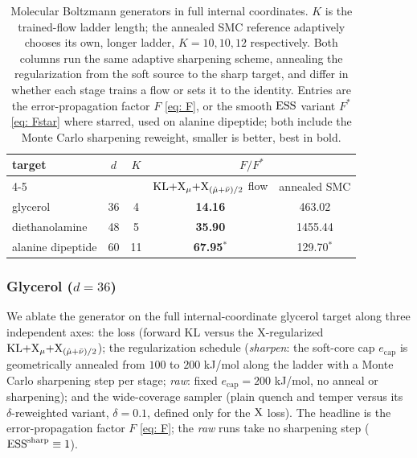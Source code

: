 \documentclass{article}
\begin{document}
\begin{table}[h]
    \centering
    \small
    \begin{tabular}{@{}lcccc@{}}
        \toprule
        \multirow{2}{*}{target} & \multirow{2}{*}{$d$} & \multirow{2}{*}{$K$} & \multicolumn{2}{c}{$F/F^{*}$} \\
        \cmidrule(l){4-5}
        & & & $\mathrm{KL}{+}\mathrm{X}_\mu{+}\mathrm{X}_{(\hat\mu+\bar\nu)/2}$ flow & annealed SMC \\
        \midrule
        glycerol            & 36 & 4  & \textbf{14.16} & 463.02 \\
        diethanolamine      & 48 & 5  & \textbf{35.90} & 1455.44 \\
        alanine dipeptide   & 60 & 11 & \textbf{67.95}$^{*}$ & 129.70$^{*}$ \\
        \bottomrule
    \end{tabular}
    \caption{Molecular Boltzmann generators in full internal coordinates. $K$ is the trained-flow ladder
    length; the annealed SMC reference adaptively chooses its own, longer ladder, $K = 10, 10, 12$
    respectively. Both columns run the same adaptive sharpening scheme, annealing the regularization from the
    soft source to the sharp target, and differ in whether each stage trains a flow or sets it to the
    identity. Entries are the error-propagation factor $F$ \eqref{eq: F}, or the smooth $\mathrm{ESS}$ variant
    $F^{*}$ \eqref{eq: Fstar} where starred, used on alanine dipeptide; both include the Monte Carlo
    sharpening reweight, smaller is better, best in bold.}
    \label{tab: overview}
\end{table}

\subsubsection{Glycerol ($d = 36$)}
\label{sec: glycerol}

We ablate the generator on the full internal-coordinate glycerol target along three independent axes: the loss
(forward KL versus the X-regularized $\mathrm{KL}{+}\mathrm{X}_\mu{+}\mathrm{X}_{(\hat\mu+\bar\nu)/2}$); the regularization schedule
(\emph{sharpen}: the soft-core cap $e_{\mathrm{cap}}$ is geometrically annealed from $100$ to $200$ kJ/mol along the ladder with a
Monte Carlo sharpening step per stage; \emph{raw}: fixed $e_{\mathrm{cap}} = 200$ kJ/mol, no anneal or sharpening); and the
wide-coverage sampler (plain quench and temper versus its $\delta$-reweighted variant, $\delta = 0.1$, defined
only for the $\mathrm{X}$ loss). The headline is the error-propagation factor $F$ \eqref{eq: F}; the \emph{raw} runs
take no sharpening step ($\mathrm{ESS}^{\mathrm{sharp}} \equiv 1$).
\end{document}
